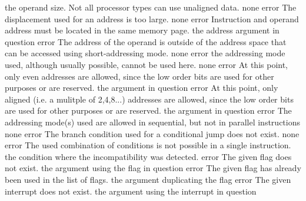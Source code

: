 \documentclass[12pt,twoside]{report}
\begin{document}
\begin{description}
{                the operand size. Not all processor types can use unaligned
                data.}
               {none}
               {error}
               {The displacement used for an address is too large.}
               {none}
               {error}
               {Instruction and operand address must be located in the
                same memory page.}
               {the address argument in question}
               {error}
               {The address of the operand is outside of the address space
                that can be accessed using short-addressing mode.}
               {none}
               {error}
               {the addressing mode used, although usually possible,
                cannot be used here.}
               {none}
               {error}
               {At this point, only even addresses are allowed, since the
                low order bits are used for other purposes or are reserved.}
               {the argument in question}
               {error}
               {At this point, only aligned (i.e. a mulitple of 2,4,8...) addresses
                are allowed, since the low order bits are used for other purposes
                or are reserved.}
               {the argument in question}
               {error}
               {The addressing mode(s) used are allowed in sequential,
                but not in parallel instructions}
               {none}
               {error}
               {The branch condition used for a conditional jump does not
                exist.}
               {none}
               {error}
               {The used combination of conditions is not possible
                in a single instruction.}
               {the condition where the incompatibility was detected.}
               {error}
               {The given flag does not exist.}
               {the argument using the flag in question}
               {error}
               {The given flag has already been used in the list of flags.}
               {the argument duplicating the flag}
               {error}
               {The given interrupt does not exist.}
               {the argument using the interrupt in question}

\end{description}
\end{document}
